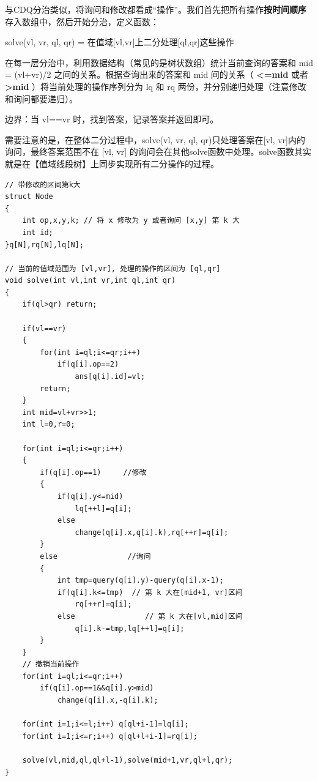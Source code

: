 \par \noindent 与CDQ分治类似，将询问和修改都看成“操作”。我们首先把所有操作\textbf{按时间顺序}存入数组中，然后开始分治，定义函数：
\begin{tcolorbox}
\par solve(vl, vr, ql, qr) = 在值域[vl,vr]上二分处理[ql,qr]这些操作
\end{tcolorbox}
\par \noindent 在每一层分治中，利用数据结构（常见的是树状数组）统计当前查询的答案和 mid = (vl+vr)/2 之间的关系。根据查询出来的答案和 mid 间的关系（ \textbf{<=mid} 或者 \textbf{>mid} ）将当前处理的操作序列分为 lq 和 rq 两份，并分别递归处理（注意修改和询问都要递归）。
~\\
\par \noindent 边界：当 vl==vr 时，找到答案，记录答案并返回即可。
~\\
\par \noindent 需要注意的是，在整体二分过程中，solve(vl, vr, ql, qr)只处理答案在[vl, vr]内的询问，最终答案范围不在 [vl, vr] 的询问会在其他solve函数中处理。solve函数其实就是在【值域线段树】上同步实现所有二分操作的过程。
\begin{verbatim}
// 带修改的区间第k大
struct Node
{
    int op,x,y,k; // 将 x 修改为 y 或者询问 [x,y] 第 k 大
    int id;
}q[N],rq[N],lq[N];

// 当前的值域范围为 [vl,vr], 处理的操作的区间为 [ql,qr]
void solve(int vl,int vr,int ql,int qr)
{
    if(ql>qr) return;

    if(vl==vr)
    {
        for(int i=ql;i<=qr;i++)
            if(q[i].op==2)
                ans[q[i].id]=vl;
        return;
    }
    int mid=vl+vr>>1;
    int l=0,r=0;

    for(int i=ql;i<=qr;i++)
    {
        if(q[i].op==1)     //修改
        {
            if(q[i].y<=mid)
                lq[++l]=q[i];
            else
                change(q[i].x,q[i].k),rq[++r]=q[i];
        }
        else                //询问
        {
            int tmp=query(q[i].y)-query(q[i].x-1);
            if(q[i].k<=tmp)  // 第 k 大在[mid+1, vr]区间
                rq[++r]=q[i];
            else                // 第 k 大在[vl,mid]区间
                q[i].k-=tmp,lq[++l]=q[i];
        }
    }
    // 撤销当前操作
    for(int i=ql;i<=qr;i++)
        if(q[i].op==1&&q[i].y>mid)
            change(q[i].x,-q[i].k);

    for(int i=1;i<=l;i++) q[ql+i-1]=lq[i];
    for(int i=1;i<=r;i++) q[ql+l+i-1]=rq[i];

    solve(vl,mid,ql,ql+l-1),solve(mid+1,vr,ql+l,qr);
}
\end{verbatim}